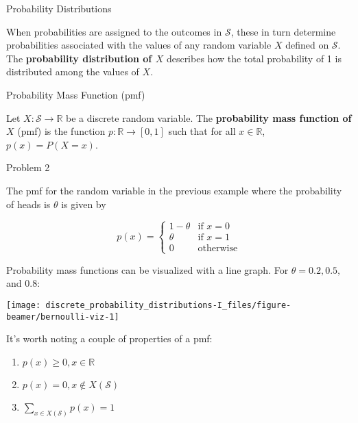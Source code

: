\documentclass[ignorenonframetext,aspectratio=169]{beamer}
\providecommand{\tightlist}{%
  \setlength{\itemsep}{0pt}\setlength{\parskip}{0pt}}
\begin{document}
\begin{frame}{Probability Distributions}
\protect\hypertarget{probability-distributions-1}{}

When probabilities are assigned to the outcomes in \(\mathcal{S}\),
these in turn determine probabilities associated with the values of any
random variable \(X\) defined on \(\mathcal{S}\). The
\textbf{probability distribution of \(X\)} describes how the total
probability of 1 is distributed among the values of \(X\).

\end{frame}

\begin{frame}{Probability Mass Function (pmf)}
\protect\hypertarget{probability-mass-function-pmf}{}

Let \(X:\mathcal{S}\rightarrow\mathbb{R}\) be a discrete random
variable. The \textbf{probability mass function of \(X\)} (pmf) is the
function \(p:\mathbb{R}\rightarrow[0,1]\) such that for all
\(x\in\mathbb{R}\), \(p(x)=P(X=x)\).

\end{frame}

\begin{frame}{Problem 2}
\protect\hypertarget{problem-2}{}

The pmf for the random variable in the previous example where the
probability of heads is \(\theta\) is given by

\[p(x) = 
  \begin{cases} 
    1-\theta & \text{if  } x=0 \\ 
    \theta & \text{if  } x=1 \\
    0 & \text{otherwise}
  \end{cases}
\]

\end{frame}

\begin{frame}{}
\protect\hypertarget{section}{}

Probability mass functions can be visualized with a line graph. For
\(\theta = 0.2, 0.5,\) and \(0.8\):

\begin{center}\texttt{[image: discrete\_probability\_distributions-I\_files/figure-beamer/bernoulli-viz-1]} \end{center}

It's worth noting a couple of properties of a pmf:

\begin{enumerate}
\tightlist
\item
  \(p(x)\geq 0, x \in \mathbb R\)
\item
  \(p(x)=0, x \notin X(\mathcal S)\)
\item
  \(\sum_{x\in X(\mathcal S)}p(x)=1\)
\end{enumerate}

\end{frame}
\end{document}
